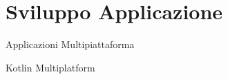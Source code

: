 
\section{Sviluppo Applicazione}

\begin{frame}{Applicazioni Multipiattaforma}
    
\end{frame}

\begin{frame}{Kotlin Multiplatform}
    
\end{frame}